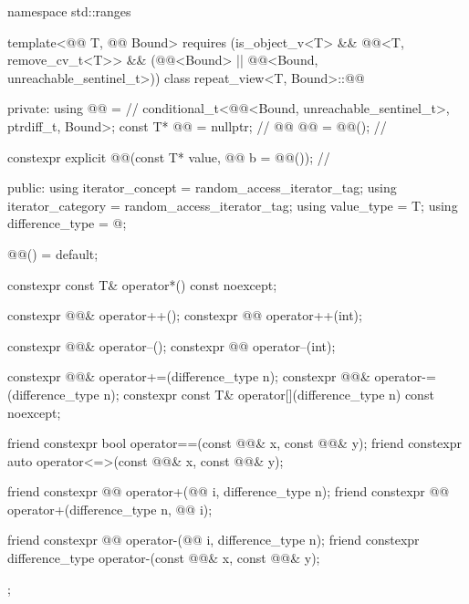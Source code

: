 \begin{codeblock}
namespace std::ranges {
  template<@@ T, @@ Bound>
    requires (is_object_v<T> && @@<T, remove_cv_t<T>> &&
              (@@<Bound> ||
               @@<Bound, unreachable_sentinel_t>))
  class repeat_view<T, Bound>::@@ {
  private:
    using @@ =                          // \expos
      conditional_t<@@<Bound, unreachable_sentinel_t>, ptrdiff_t, Bound>;
    const T* @@ = nullptr;                  // \expos
    @@ @@ = @@();         // \expos

    constexpr explicit @@(const T* value, @@ b = @@());   // \expos

  public:
    using iterator_concept = random_access_iterator_tag;
    using iterator_category = random_access_iterator_tag;
    using value_type = T;
    using difference_type = @\seebelow@;

    @@() = default;

    constexpr const T& operator*() const noexcept;

    constexpr @@& operator++();
    constexpr @@ operator++(int);

    constexpr @@& operator--();
    constexpr @@ operator--(int);

    constexpr @@& operator+=(difference_type n);
    constexpr @@& operator-=(difference_type n);
    constexpr const T& operator[](difference_type n) const noexcept;

    friend constexpr bool operator==(const @@& x, const @@& y);
    friend constexpr auto operator<=>(const @@& x, const @@& y);

    friend constexpr @@ operator+(@@ i, difference_type n);
    friend constexpr @@ operator+(difference_type n, @@ i);

    friend constexpr @@ operator-(@@ i, difference_type n);
    friend constexpr difference_type operator-(const @@& x, const @@& y);
  };
}
\end{codeblock}

